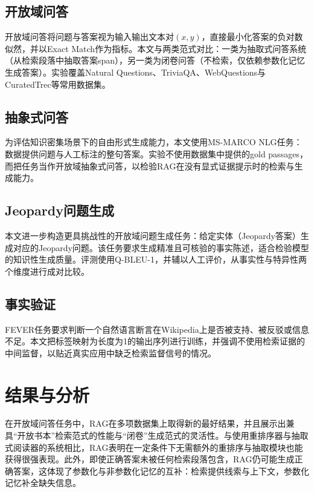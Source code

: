 \subsection{开放域问答}
开放域问答将问题与答案视为输入输出文本对$(x,y)$，直接最小化答案的负对数似然，并以Exact Match作为指标。本文与两类范式对比：一类为抽取式问答系统（从检索段落中抽取答案span），另一类为闭卷问答（不检索，仅依赖参数化记忆生成答案）。实验覆盖Natural Questions、TriviaQA、WebQuestions与CuratedTrec等常用数据集。

\subsection{抽象式问答}
为评估知识密集场景下的自由形式生成能力，本文使用MS-MARCO NLG任务：数据提供问题与人工标注的整句答案。实验不使用数据集中提供的gold passages，而把任务当作开放域抽象式问答，以检验RAG在没有显式证据提示时的检索与生成能力。

\subsection{Jeopardy问题生成}
本文进一步构造更具挑战性的开放域问题生成任务：给定实体（Jeopardy答案）生成对应的Jeopardy问题。该任务要求生成精准且可核验的事实陈述，适合检验模型的知识性生成质量。评测使用Q-BLEU-1，并辅以人工评价，从事实性与特异性两个维度进行成对比较。

\subsection{事实验证}
FEVER任务要求判断一个自然语言断言在Wikipedia上是否被支持、被反驳或信息不足。本文把标签映射为长度为1的输出序列进行训练，并强调不使用检索证据的中间监督，以贴近真实应用中缺乏检索监督信号的情况。

\section{结果与分析}
在开放域问答任务中，RAG在多项数据集上取得新的最好结果，并且展示出兼具“开放书本”检索范式的性能与“闭卷”生成范式的灵活性。与使用重排序器与抽取式阅读器的系统相比，RAG表明在一定条件下无需额外的重排序与抽取模块也能获得很强表现。此外，即使正确答案未被任何检索段落包含，RAG仍可能生成正确答案，这体现了参数化与非参数化记忆的互补：检索提供线索与上下文，参数化记忆补全缺失信息。

